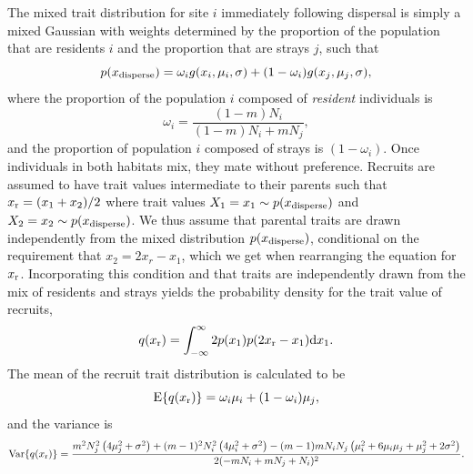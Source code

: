\documentclass{revtex4}
\begin{document}
The mixed trait distribution for site $i$ immediately following dispersal is simply a mixed Gaussian with weights determined by the proportion of the population that are residents $i$ and the proportion that are strays $j$, such that 
\begin{equation}
  p(x_{\rm disperse}) = \omega_i g(x_i,\mu_i,\sigma) + (1-\omega_i)g(x_j,\mu_j,\sigma),
\end{equation}
where the proportion of the population $i$ composed of \emph{resident} individuals is
\begin{equation}
  \omega_i = \frac{(1-m)N_i}{(1-m)N_i + mN_j},
\end{equation}
and the proportion of population $i$ composed of strays is $(1-\omega_i)$.
Once individuals in both habitats mix, they mate without preference.
Recruits are assumed to have trait values intermediate to their parents such that $x_{\rm r} = (x_{1} + x_{2})/2$ where trait values $X_1=x_{1}\sim p(x_{\rm disperse})$ and $X_2=x_{2}\sim p(x_{\rm disperse})$.
We thus assume that parental traits are drawn independently from the mixed distribution $p(x_{\rm disperse})$, conditional on the requirement that $x_2 = 2x_r - x_1$, which we get when rearranging the equation for $x_{\rm r}$.
Incorporating this condition and that traits are independently drawn from the mix of residents and strays yields the probability density for the trait value of recruits,
\begin{equation}
  q(x_{\rm r}) = \int_{-\infty}^\infty 2p(x_1)p(2x_{\rm r}-x_1){\rm d}x_1.
\end{equation}
The mean of the recruit trait distribution is calculated to be
\begin{equation}
{\rm E}\{q(x_{\rm r})\}=\omega_i\mu_i + (1-\omega_i)\mu_j,
\end{equation} 
and the variance is
\begin{equation}
  {\rm Var}\{q(x_{\rm r})\} = \frac{m^2 N_j^2 \left(4 \mu_j^2+\sigma ^2\right)+(m-1)^2 N_i^2 \left(4 \mu_i^2+\sigma ^2\right)-(m-1) m N_i N_j \left(\mu_i^2+6 \mu_i \mu_j+\mu_j^2+2 \sigma ^2\right)}{2 (-m N_i+m N_j+N_i)^2}.
\end{equation}
\end{document}
